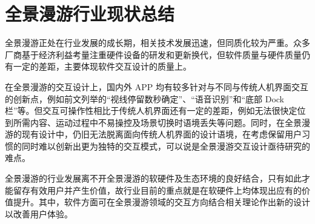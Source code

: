 \section{全景漫游行业现状总结}

全景漫游正处在行业发展的成长期，相关技术发展迅速，但同质化较为严重。众多厂商基于经济利益考量注重硬件设备的研发和更新换代，但软件质量与硬件质量仍有一定的差距，主要体现软件交互设计的质量上。

在全景漫游的交互设计上，国内外 APP 均有较多针对与不同与传统人机界面交互的创新点，例如前文列举的“视线停留数秒确定”、“语音识别”和“底部 Dock 栏”等。但交互可操作性相比于传统人机界面还有一定的差距，例如无法很快定位到所需内容、运动过程中不易操控及场景切换时语境丢失等问题。同时，在全景漫游的现有设计中，仍旧无法脱离面向传统人机界面的设计语境，在考虑保留用户习惯的同时难以创新出更为独特的交互模式，可以说是全景漫游交互设计亟待研究的难点。

全景漫游的行业发展离不开全景漫游的软硬件及生态环境的良好结合，只有如此才能留存有效用户并产生价值，故行业目前的重点就是在软硬件上均体现出应有的价值提升。其中，软件方面可在全景漫游领域的交互方向结合相关理论作出新的设计以改善用户体验。
